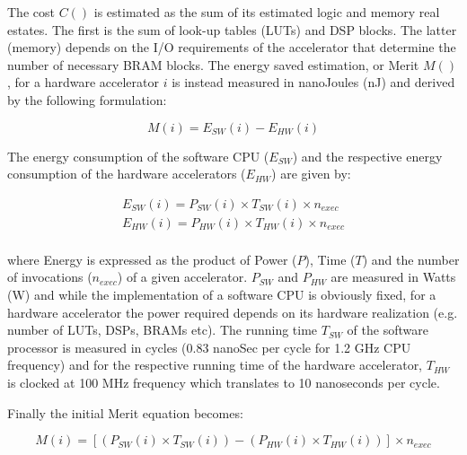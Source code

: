 \documentclass[]{usiinfthesis}
\begin{document}
The cost $C()$ is estimated as the sum of its estimated logic and memory real estates. The first is 
the sum of look-up tables (LUTs) and DSP blocks. 
The latter (memory) depends on the I/O requirements of the accelerator that determine the number of necessary 
BRAM blocks. The energy saved estimation, or Merit $M()$, for a hardware accelerator $i$ is instead 
measured in nanoJoules (nJ) and derived by the following formulation:

\begin{equation*}
M(i)  = E_{SW}(i) - E_{HW}(i)
\label{eq:energy_simple}
\end{equation*}

The energy consumption of the software CPU ($E_{SW}$) and the respective energy consumption of the hardware
accelerators ($E_{HW}$) are given by:

\begin{equation*}
\begin{aligned}
E_{SW}(i) = P_{SW}(i) \times T_{SW}(i) \times n_{exec}\\
E_{HW}(i) = P_{HW}(i) \times T_{HW}(i) \times n_{exec}\\
\end{aligned}
\end{equation*}

where Energy is expressed as the product of Power ($P$), Time ($T$) and the number of invocations ($n_{exec}$) 
of a given accelerator. $P_{SW}$ and $P_{HW}$ are measured in Watts (W) and 
while the implementation of a software CPU is obviously fixed, 
for a hardware 
accelerator the power required depends on its hardware realization 
(e.g. number of LUTs, DSPs, BRAMs etc). The running time $T_{SW}$ of the software processor 
is measured in cycles (0.83 nanoSec per cycle for 1.2 GHz CPU frequency) and for the respective
running time of the hardware accelerator, $T_{HW}$ is clocked at 100 MHz frequency which
translates to 10 nanoseconds per cycle.

Finally the initial Merit equation becomes: 

\begin{equation*}
M(i)  = [ (P_{SW}(i) \times T_{SW}(i)) - (P_{HW}(i) \times T_{HW}(i)) ] \times n_{exec}
\end{equation*}
\end{document}
